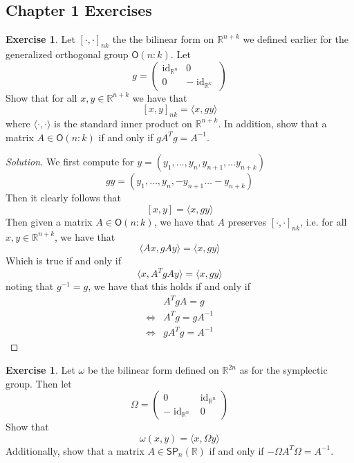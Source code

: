 \documentclass[psamsfonts]{amsart}
\theoremstyle{definition}
\newtheorem{exer}[thm]{Exercise}
\theoremstyle{remark}
\newcommand{\R}{\mathbb{R}}
\newcommand{\SP}{\mathsf{SP}}
\newcommand{\inv}{^{-1}}
\DeclareMathOperator{\id}{id}
\begin{document}
\subsection*{Chapter 1 Exercises}

\setcounter{thm}{0}
\begin{exer}
Let $[\cdot,\cdot]_{nk}$ the the bilinear form on $\R^{n+k}$  we defined earlier for the generalized orthogonal group $\mathsf{O}(n:k)$. Let
$$g = \begin{pmatrix}
\id_{\R^n} & 0 \\
0 & -\id_{\R^k}
\end{pmatrix} $$
Show that for all $x,y \in \R^{n+k}$ we have that 
$$[x,y]_{nk} = \langle x, gy \rangle $$
where $\langle \cdot, \cdot \rangle$ is the standard inner product on $\R^{n+k}$. In addition, show that a matrix $A \in \mathsf{O}(n:k)$ if and only if $gA^Tg = A\inv$.
\end{exer}

\begin{proof}[Solution]
We first compute for $y = (y_1, \ldots, y_n, y_{n+1}, \ldots y_{n+k})$
$$gy = (y_1, \ldots, y_n, -y_{n+1} \ldots -y_{n+k}) $$
Then it clearly follows that 
$$[x,y] = \langle x, gy \rangle $$
Then given a matrix $A \in \mathsf{O}(n:k)$, we have that $A$ preserves $[\cdot,\cdot]_{nk}$, i.e. for all $x,y \in \R^{n+k}$, we have that
$$\langle Ax,gAy \rangle = \langle x, gy \rangle $$
Which is true if and only if 
$$\langle x, A^TgAy \rangle = \langle x, gy \rangle $$
noting that $g\inv = g$, we have that this holds if and only if 
\begin{align*}
&A^TgA = g \\
\iff &A^Tg = gA\inv \\
\iff &gA^Tg = A\inv
\end{align*}
\end{proof}

\begin{exer}
Let $\omega$ be the bilinear form defined on $\R^{2n}$ as for the symplectic group. Then let 
$$\Omega = \begin{pmatrix}
0 & \id_{\R^n} \\
-\id_{\R^n} & 0 
\end{pmatrix} $$
Show that 
$$\omega(x,y) = \langle x, \Omega y \rangle $$
Additionally, show that a matrix $A \in \SP_n(\R)$ if and only if $-\Omega A^T\Omega = A\inv$.
\end{exer}
\end{document}
